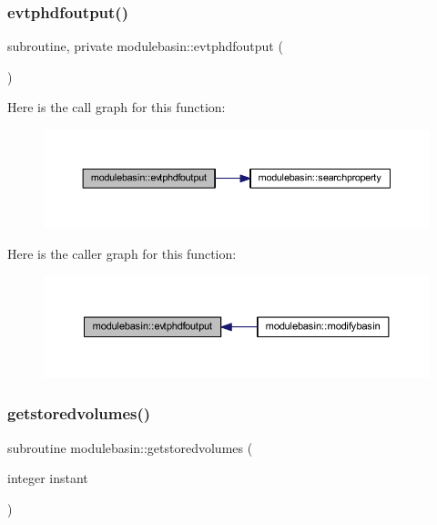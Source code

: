 \subsubsection{\texorpdfstring{evtphdfoutput()}{evtphdfoutput()}}
{\footnotesize\ttfamily subroutine, private modulebasin\+::evtphdfoutput (\begin{DoxyParamCaption}{ }\end{DoxyParamCaption})\hspace{0.3cm}{\ttfamily [private]}}

Here is the call graph for this function\+:\nopagebreak
\begin{figure}[H]
\begin{center}
\leavevmode
\includegraphics[width=350pt]{namespacemodulebasin_ac386c2a8b57550077a00db68e3c300ab_cgraph}
\end{center}
\end{figure}
Here is the caller graph for this function\+:\nopagebreak
\begin{figure}[H]
\begin{center}
\leavevmode
\includegraphics[width=350pt]{namespacemodulebasin_ac386c2a8b57550077a00db68e3c300ab_icgraph}
\end{center}
\end{figure}
\mbox{\label{namespacemodulebasin_a51eb37f44f2fb4685ca3ed3454156732}} 
\subsubsection{\texorpdfstring{getstoredvolumes()}{getstoredvolumes()}}
{\footnotesize\ttfamily subroutine modulebasin\+::getstoredvolumes (\begin{DoxyParamCaption}\item[{integer}]{instant }\end{DoxyParamCaption})\hspace{0.3cm}{\ttfamily [private]}}

